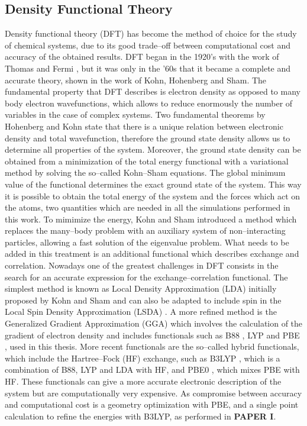 \subsection*{Density Functional Theory}
Density functional theory (DFT) has become the method of choice for the study of chemical systems, due to its good trade--off between computational cost and accuracy of the obtained results. DFT began in the 1920’s with the work of Thomas and Fermi \cite{Thomas1927, Fermi1928}, but it was only in the ’60s that it became a complete and accurate theory, shown in the work of Kohn, Hohenberg and Sham\cite{Hohenberg1964}. The fundamental property that DFT describes is electron density as opposed to many body electron wavefunctions, which allows to reduce enormously the number of variables in the case of complex systems. Two fundamental theorems by Hohenberg and Kohn state that there is a unique relation between electronic density and total wavefunction, therefore the ground state density allows us to determine all properties of the system. Moreover, the ground state density can be obtained from a minimization of the total energy functional with a variational method by solving the so--called Kohn--Sham equations. The global minimum value of the functional determines the exact ground state of the system. This way it is possible to obtain the total energy of the system and the forces which act on the atoms, two quantities which are needed in all the simulations performed in this work. 
\npar
To mimimize the energy, Kohn and Sham \cite{Kohn1965} introduced a method which replaces the many--body problem with an auxiliary system of non--interacting particles, allowing a fast solution of the eigenvalue problem. What needs to be added in this treatment is an additional functional which describes exchange and correlation. Nowadays one of the greatest challenges in DFT consists in the search for an accurate expression for the exchange--correlation functional.
The simplest method is known as Local Density Approximation (LDA) initially proposed by Kohn and Sham \cite{Kohn1965} and can also be adapted to include spin in the Local Spin Density Approximation (LSDA) \cite{Vosko1980}. A more refined method is the Generalized Gradient Approximation (GGA) which involves the calculation of the gradient of electron density and includes functionals such as B88 \cite{Becke1988}, LYP \cite{Lee1988} and PBE \cite{Perdew1996, Perdew1997}, used in this thesis. 
 More recent functionals are the so--called hybrid functionals, which include the Hartree--Fock (HF) exchange, such as B3LYP \cite{Becke1988, Becke1993, Lee1988}, which is a combination of B88, LYP and LDA with HF, and PBE0 \cite{Adamo1999}, which mixes PBE with HF. These functionals can give a more accurate electronic description of the system but are computationally very expensive. As compromise between accuracy and computational cost is a geometry optimization with PBE, and a single point calculation to refine the energies with B3LYP, as performed in \textbf{PAPER I}.

